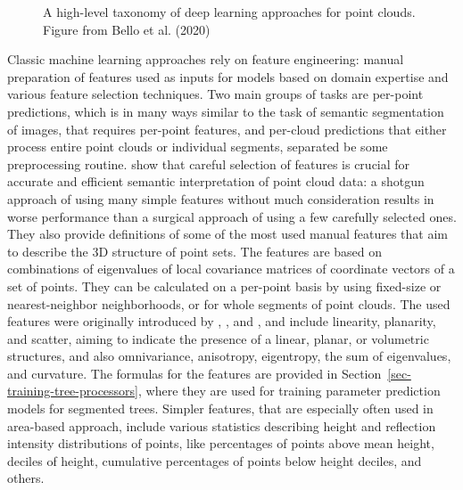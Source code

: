 \begin{figure}
\caption{\label{fig-deep-learnin-on-point-clouds}A high-level taxonomy
of deep learning approaches for point clouds. Figure from Bello et al.
(2020)}
\end{figure}

Classic machine learning approaches rely on feature engineering: manual preparation of features used as inputs for models based on domain expertise and various feature selection techniques.
Two main groups of tasks are per-point predictions, which is in many ways similar to the task of semantic segmentation of images, that requires per-point features, and per-cloud predictions that either process entire point clouds or individual segments, separated be some preprocessing routine.
\citet{weinmannFeatureRelevanceAssessment2013} show that careful selection of features is crucial for accurate and efficient semantic interpretation of point cloud data: a shotgun approach of using many simple features without much consideration results in worse performance than a surgical approach of using a few carefully selected ones.
They also provide definitions of some of the most used manual features that aim to describe the 3D structure of point sets.
The features are based on combinations of eigenvalues of local covariance matrices of coordinate vectors of a set of points.
They can be calculated on a per-point basis by using fixed-size or nearest-neighbor neighborhoods, or for whole segments of point clouds.
The used features were originally introduced by \citet{westContextdrivenAutomatedTarget2004}, \citet{paulyEfficientSimplificationPointsampled2002}, and \citet{malletRelevanceAssessmentFullwaveform2011}, and include linearity, planarity, and scatter, aiming to indicate the presence of a linear, planar, or volumetric structures, and also omnivariance, anisotropy, eigentropy, the sum of eigenvalues, and curvature.
The formulas for the features are provided in Section~\ref{sec-training-tree-processors}, where they are used for training parameter prediction models for segmented trees.
Simpler features, that are especially often used in area-based approach, include various statistics describing height and reflection intensity distributions of points, like percentages of points above mean height, deciles of height, cumulative percentages of points below height deciles, and others.

